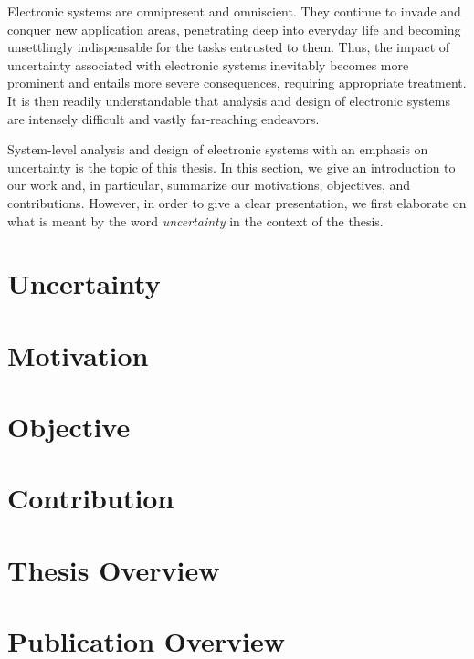 Electronic systems are omnipresent and omniscient. They continue to invade and
conquer new application areas, penetrating deep into everyday life and becoming
unsettlingly indispensable for the tasks entrusted to them. Thus, the impact of
uncertainty associated with electronic systems inevitably becomes more prominent
and entails more severe consequences, requiring appropriate treatment. It is
then readily understandable that analysis and design of electronic systems are
intensely difficult and vastly far-reaching endeavors.

System-level analysis and design of electronic systems with an emphasis on
uncertainty is the topic of this thesis. In this section, we give an
introduction to our work and, in particular, summarize our motivations,
objectives, and contributions. However, in order to give a clear presentation,
we first elaborate on what is meant by the word \emph{uncertainty} in the
context of the thesis.

\section{Uncertainty}

\section{Motivation}

\section{Objective}

\section{Contribution}

\section{\pasttitle}

\section{Thesis Overview}

\section{Publication Overview}
